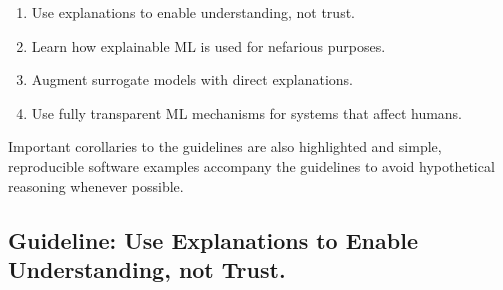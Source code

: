 \documentclass[fleqn]{article}
\begin{document}
\begin{enumerate}

\item Use explanations to enable understanding, not trust.
\item Learn how explainable ML is used for nefarious purposes.
\item Augment surrogate models with direct explanations.
\item Use fully transparent ML mechanisms for systems that affect humans.

\end{enumerate}

\noindent Important corollaries to the guidelines are also highlighted and simple, reproducible software examples accompany the guidelines to avoid hypothetical reasoning whenever possible. 

\subsection{Guideline: Use Explanations to Enable Understanding, not Trust.} \label{sec:trust}
\end{document}
